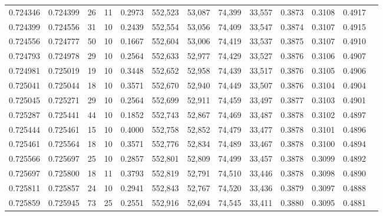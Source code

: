 \begin{tabular}{rrrrrrrrrrrrr}
0.724346 & 0.724399 &    26 &  11 &                                     0.2973 & 552,523 &  53,087 &  74,399 &  33,557 & 0.3873 & 0.3108 & 0.4917 \\
0.724399 & 0.724556 &    31 &  10 &                                     0.2439 & 552,554 &  53,056 &  74,409 &  33,547 & 0.3874 & 0.3107 & 0.4915 \\
0.724556 & 0.724777 &    50 &  10 &                                     0.1667 & 552,604 &  53,006 &  74,419 &  33,537 & 0.3875 & 0.3107 & 0.4910 \\
0.724793 & 0.724978 &    29 &  10 &                                     0.2564 & 552,633 &  52,977 &  74,429 &  33,527 & 0.3876 & 0.3106 & 0.4907 \\
0.724981 & 0.725019 &    19 &  10 &                                     0.3448 & 552,652 &  52,958 &  74,439 &  33,517 & 0.3876 & 0.3105 & 0.4906 \\
0.725041 & 0.725044 &    18 &  10 &                                     0.3571 & 552,670 &  52,940 &  74,449 &  33,507 & 0.3876 & 0.3104 & 0.4904 \\
0.725045 & 0.725271 &    29 &  10 &                                     0.2564 & 552,699 &  52,911 &  74,459 &  33,497 & 0.3877 & 0.3103 & 0.4901 \\
0.725287 & 0.725441 &    44 &  10 &                                     0.1852 & 552,743 &  52,867 &  74,469 &  33,487 & 0.3878 & 0.3102 & 0.4897 \\
0.725444 & 0.725461 &    15 &  10 &                                     0.4000 & 552,758 &  52,852 &  74,479 &  33,477 & 0.3878 & 0.3101 & 0.4896 \\
0.725461 & 0.725564 &    18 &  10 &                                     0.3571 & 552,776 &  52,834 &  74,489 &  33,467 & 0.3878 & 0.3100 & 0.4894 \\
0.725566 & 0.725697 &    25 &  10 &                                     0.2857 & 552,801 &  52,809 &  74,499 &  33,457 & 0.3878 & 0.3099 & 0.4892 \\
0.725697 & 0.725800 &    18 &  11 &                                     0.3793 & 552,819 &  52,791 &  74,510 &  33,446 & 0.3878 & 0.3098 & 0.4890 \\
0.725811 & 0.725857 &    24 &  10 &                                     0.2941 & 552,843 &  52,767 &  74,520 &  33,436 & 0.3879 & 0.3097 & 0.4888 \\
0.725859 & 0.725945 &    73 &  25 &                                     0.2551 & 552,916 &  52,694 &  74,545 &  33,411 & 0.3880 & 0.3095 & 0.4881 \\

\end{tabular}
